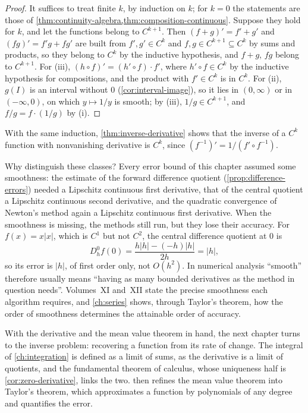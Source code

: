 \begin{proof}
It suffices to treat finite $k$, by induction on $k$; for $k=0$ the statements are those of \cref{thm:continuity-algebra,thm:composition-continuous}. Suppose they hold for $k$, and let the functions belong to $C^{k+1}$. Then $(f+g)'=f'+g'$ and $(fg)'=f'g+fg'$ are built from $f',g'\in C^k$ and $f,g\in C^{k+1}\subseteq C^k$ by sums and products, so they belong to $C^k$ by the inductive hypothesis, and $f+g$, $fg$ belong to $C^{k+1}$. For (iii), $(h\circ f)'=(h'\circ f)\cdot f'$, where $h'\circ f\in C^k$ by the inductive hypothesis for compositions, and the product with $f'\in C^k$ is in $C^k$. For (ii), $g(I)$ is an interval without $0$ (\cref{cor:interval-image}), so it lies in $(0,\infty)$ or in $(-\infty,0)$, on which $y\mapsto1/y$ is smooth; by (iii), $1/g\in C^{k+1}$, and $f/g=f\cdot(1/g)$ by (i).
\end{proof}

With the same induction, \cref{thm:inverse-derivative} shows that the inverse of a $C^k$ function with nonvanishing derivative is $C^k$, since $(f^{-1})'=1/(f'\circ f^{-1})$.

Why distinguish these classes? Every error bound of this chapter assumed some smoothness: the estimate of the forward difference quotient (\cref{prop:difference-errors}) needed a Lipschitz continuous first derivative, that of the central quotient a Lipschitz continuous second derivative, and the quadratic convergence of Newton's method again a Lipschitz continuous first derivative. When the smoothness is missing, the methods still run, but they lose their accuracy. For $f(x)=x|x|$, which is $C^1$ but not $C^2$, the central difference quotient at $0$ is
\[
D_h^0f(0)=\frac{h|h|-(-h)|h|}{2h}=|h| ,
\]
so its error is $|h|$, of first order only, not $O(h^2)$. In numerical analysis ``smooth'' therefore usually means ``having as many bounded derivatives as the method in question needs''. Volumes~XI and~XII state the precise smoothness each algorithm requires, and \cref{ch:series} shows, through Taylor's theorem, how the order of smoothness determines the attainable order of accuracy.

\bigskip
With the derivative and the mean value theorem in hand, the next chapter turns to the inverse problem: recovering a function from its rate of change. The integral of \cref{ch:integration} is defined as a limit of sums, as the derivative is a limit of quotients, and the fundamental theorem of calculus, whose uniqueness half is \cref{cor:zero-derivative}, links the two.  then refines the mean value theorem into Taylor's theorem, which approximates a function by polynomials of any degree and quantifies the error.

